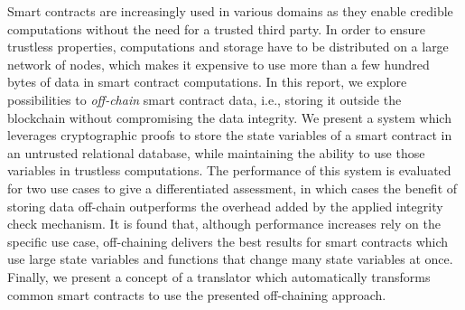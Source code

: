 Smart contracts are increasingly used in various domains as they enable credible computations without the need for a trusted third party.
In order to ensure trustless properties, computations and storage have to be distributed on a large network of nodes, which makes it expensive to use more than a few hundred bytes of data in smart contract computations.
In this report, we explore possibilities to \emph{off-chain} smart contract data, i.e., storing it outside the blockchain without compromising the data integrity.
We present a system which leverages cryptographic proofs to store the state variables of a smart contract in an untrusted relational database, while maintaining the ability to use those variables in trustless computations.
The performance of this system is evaluated for two use cases to give a differentiated assessment, in which cases the benefit of storing data off-chain outperforms the overhead added by the applied integrity check mechanism.
It is found that, although performance increases rely on the specific use case, off-chaining delivers the best results for smart contracts which use large state variables and functions that change many state variables at once.
Finally, we present a concept of a translator which automatically transforms common smart contracts to use the presented off-chaining approach.
